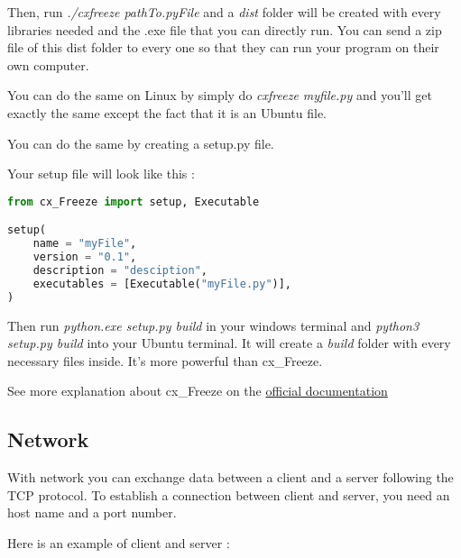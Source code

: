 \documentclass[a4paper, 12pt, titlepage]{scrartcl} %
\begin{document}
\vspace{5mm}

Then, run \textit{./cxfreeze pathTo.pyFile} and a \textit{dist} folder will be created with every libraries needed and the .exe file that you can directly run. You can send a zip file of this dist folder to every one so that they can run your program on their own computer.

\vspace{5mm}

You can do the same on Linux by simply do \textit{cxfreeze myfile.py} and you'll get exactly the same except the fact that it is an Ubuntu file.

\vspace{10mm}

You can do the same by creating a setup.py file.

\vspace{5mm}

Your setup file will look like this : 
\begin{lstlisting}[language=Python]
from cx_Freeze import setup, Executable

setup(
    name = "myFile",
    version = "0.1",
    description = "desciption",
    executables = [Executable("myFile.py")],
)
\end{lstlisting} \vspace{5mm}

Then run \textit{python.exe setup.py build} in your windows terminal and \textit{python3 setup.py build} into your Ubuntu terminal. It will create a \textit{build} folder with every necessary files inside. It's more powerful than cx\_Freeze.

See more explanation about cx\_Freeze on the  \href{https://cx-freeze.readthedocs.io/en/latest/}{official documentation}

\subsection{Network}
With network you can exchange data between a client and a server following the TCP protocol. To establish a connection between client and server, you need an host name and a port number. 
\vspace{5mm}


Here is an example of client and server :

\vspace{5mm}
\end{document}
